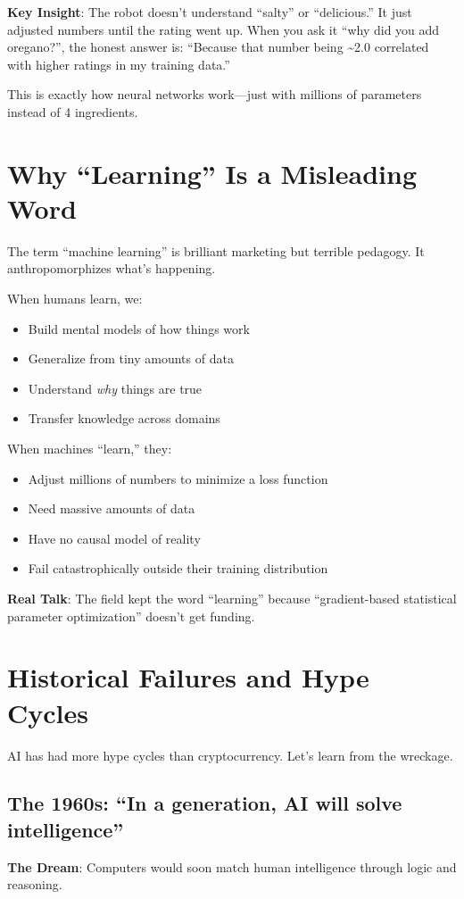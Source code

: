 \documentclass[11pt,oneside]{book}
\begin{document}
\textbf{Key Insight}: The robot doesn't understand ``salty'' or ``delicious.'' It just adjusted numbers until the rating went up. When you ask it ``why did you add oregano?'', the honest answer is: ``Because that number being \textasciitilde 2.0 correlated with higher ratings in my training data.''

This is exactly how neural networks work---just with millions of parameters instead of 4 ingredients.

\section{Why ``Learning'' Is a Misleading Word}

The term ``machine learning'' is brilliant marketing but terrible pedagogy. It anthropomorphizes what's happening.

When humans learn, we:
\begin{itemize}
\item Build mental models of how things work
\item Generalize from tiny amounts of data
\item Understand \textit{why} things are true
\item Transfer knowledge across domains
\end{itemize}

When machines ``learn,'' they:
\begin{itemize}
\item Adjust millions of numbers to minimize a loss function
\item Need massive amounts of data
\item Have no causal model of reality
\item Fail catastrophically outside their training distribution
\end{itemize}

\textbf{Real Talk}: The field kept the word ``learning'' because ``gradient-based statistical parameter optimization'' doesn't get funding.

\section{Historical Failures and Hype Cycles}

AI has had more hype cycles than cryptocurrency. Let's learn from the wreckage.

\subsection{The 1960s: ``In a generation, AI will solve intelligence''}
\textbf{The Dream}: Computers would soon match human intelligence through logic and reasoning.
\end{document}
